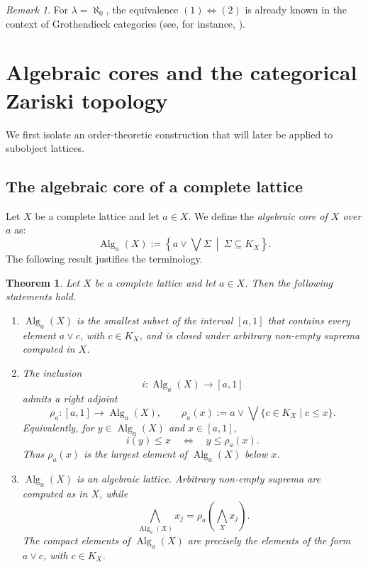 \documentclass{amsproc}
\theoremstyle{definition}
\theoremstyle{plain}
\newtheorem{Thm}[theorem]{Theorem}
\theoremstyle{remark}
\newtheorem{remark}[theorem]{Remark}
\numberwithin{equation}{section}
\newcommand{\Alg}{\operatorname{Alg}}
\begin{document}
\begin{remark}
    For $\lambda=\aleph_0$, the equivalence $(1) \Leftrightarrow (2)$ is already known in the context of Grothendieck categories (see, for instance, \cite[Chapter V, Section 3]{Sten}).
\end{remark}

\section{Algebraic cores and the categorical Zariski topology}

We first isolate an order-theoretic construction that will later be applied to subobject lattices.

\subsection{The algebraic core of a complete lattice}

Let $X$ be a complete lattice and let $a\in X$. We define the {\em algebraic core of $X$ over $a$} as:
$$
\Alg_a(X):=
\left\{
 a\vee\bigvee\Sigma
 \ \middle|\ 
 \Sigma\subseteq K_X
\right\}.
$$
The following result justifies the terminology.

\begin{Thm}\label{abstract-algebraic-core}
Let $X$ be a complete lattice and let $a\in X$. Then the following statements hold.
\begin{enumerate}
    \item $\Alg_a(X)$ is the smallest subset of the interval $[a,1]$ that contains every element $a\vee c$, with $c\in K_X$, and is closed under arbitrary non-empty suprema computed in $X$.
    \item The inclusion
    $$
    i:\Alg_a(X)\longrightarrow[a,1]
    $$
    admits a right adjoint
    $$
    \rho_a:[a,1]\longrightarrow\Alg_a(X),
    \qquad
    \rho_a(x):=a\vee\bigvee\{c\in K_X\mid c\leq x\}.
    $$
    Equivalently, for $y\in\Alg_a(X)$ and $x\in[a,1]$,
    $$
    i(y)\leq x
    \quad\Longleftrightarrow\quad
    y\leq\rho_a(x).
    $$
    Thus $\rho_a(x)$ is the largest element of $\Alg_a(X)$ below $x$.
    \item $\Alg_a(X)$ is an algebraic lattice. Arbitrary non-empty suprema are computed as in $X$, while
    $$
    \bigwedge_{\Alg_a(X)}x_j
    =
    \rho_a\left(\bigwedge_Xx_j\right).
    $$
    The compact elements of $\Alg_a(X)$ are precisely the elements of the form $a\vee c$, with $c\in K_X$.
\end{enumerate}
\end{Thm}
\end{document}
